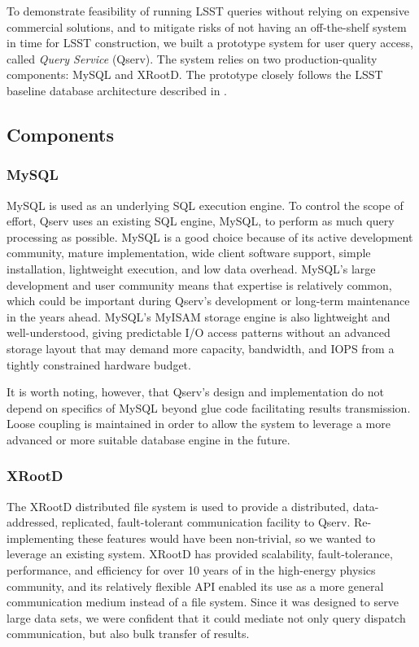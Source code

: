 \documentclass[DM,lsstdraft,toc]{lsstdoc}
\begin{document}
To demonstrate feasibility of running LSST queries without relying on
expensive commercial solutions, and to mitigate risks of not having an
off-the-shelf system in time for LSST construction, we built a prototype
system for user query access, called \emph{Query Service} (Qserv). The
system relies on two production-quality components: MySQL and
XRootD. The prototype closely follows the LSST
baseline database architecture described in .

\subsection{Components}\label{components}

\subsubsection{MySQL}\label{mysql}

MySQL is used as an underlying SQL execution engine. To control the
scope of effort, Qserv uses an existing SQL engine, MySQL, to perform as
much query processing as possible. MySQL is a good choice because of its
active development community, mature implementation, wide client
software support, simple installation, lightweight execution, and low
data overhead. MySQL's large development and user community means that
expertise is relatively common, which could be important during Qserv's
development or long-term maintenance in the years ahead. MySQL's MyISAM
storage engine is also lightweight and well-understood, giving
predictable I/O access patterns without an advanced storage layout that
may demand more capacity, bandwidth, and IOPS from a tightly constrained
hardware budget.

It is worth noting, however, that Qserv's design and implementation do
not depend on specifics of MySQL beyond glue code facilitating results
transmission. Loose coupling is maintained in order to allow the system
to leverage a more advanced or more suitable database engine in the
future.

\subsubsection{XRootD}\label{xrootd}

The XRootD distributed file system is used to
provide a distributed, data-addressed, replicated, fault-tolerant
communication facility to Qserv. Re-implementing these features would
have been non-trivial, so we wanted to leverage an existing system.
XRootD has provided scalability,
fault-tolerance, performance, and efficiency for over 10 years of in the
high-energy physics community, and its relatively flexible API enabled
its use as a more general communication medium instead of a file system.
Since it was designed to serve large data sets, we were confident that
it could mediate not only query dispatch communication, but also bulk
transfer of results.
\end{document}
